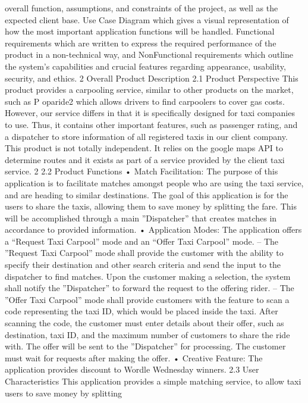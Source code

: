 overall function, assumptions, and constraints of the project, as well as the expected client base. Use
Case Diagram which gives a visual representation of how the most important application functions
will be handled. Functional requirements which are written to express the required performance
of the product in a non-technical way, and NonFunctional requirements which outline the system’s
capabilities and crucial features regarding appearance, usability, security, and ethics.
2 Overall Product Description
2.1 Product Perspective
This product provides a carpooling service, similar to other products on the market, such as
P oparide2 which allows drivers to find carpoolers to cover gas costs. However, our service differs in
that it is specifically designed for taxi companies to use. Thus, it contains other important features,
such as passenger rating, and a dispatcher to store information of all registered taxis in our client
company. This product is not totally independent. It relies on the google maps API to determine
routes and it exists as part of a service provided by the client taxi service.
2
2.2 Product Functions
• Match Facilitation: The purpose of this application is to facilitate matches amongst people
who are using the taxi service, and are heading to similar destinations. The goal of this
application is for the users to share the taxis, allowing them to save money by splitting the fare.
This will be accomplished through a main ”Dispatcher” that creates matches in accordance to
provided information.
• Application Modes: The application offers a “Request Taxi Carpool” mode and an “Offer
Taxi Carpool” mode.
– The ”Request Taxi Carpool” mode shall provide the customer with the ability to specify
their destination and other search criteria and send the input to the dispatcher to find
matches. Upon the customer making a selection, the system shall notify the ”Dispatcher”
to forward the request to the offering rider.
– The ”Offer Taxi Carpool” mode shall provide customers with the feature to scan a code
representing the taxi ID, which would be placed inside the taxi. After scanning the code,
the customer must enter details about their offer, such as destination, taxi ID, and the
maximum number of customers to share the ride with. The offer will be sent to the
”Dispatcher” for processing. The customer must wait for requests after making the offer.
• Creative Feature: The application provides discount to Wordle Wednesday winners.
2.3 User Characteristics
This application provides a simple matching service, to allow taxi users to save money by splitting
